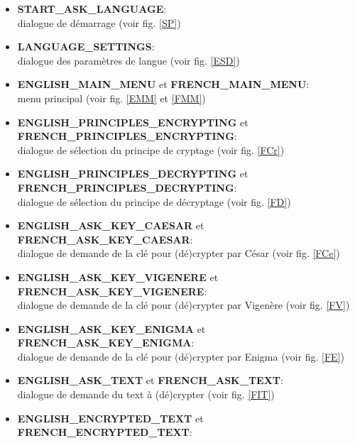\documentclass[a4paper,12pt,abstracton,titlepage]{scrartcl}
\begin{document}
{\begin{itemize}
\item \textbf{START\_ASK\_LANGUAGE}:\\
dialogue de démarrage (voir fig. \ref{SP})\\
\item \textbf{LANGUAGE\_SETTINGS}:\\
dialogue des paramètres de langue (voir fig. \ref{ESD})\\
\item \textbf{ENGLISH\_MAIN\_MENU} et \textbf{FRENCH\_MAIN\_MENU}:\\
menu principal (voir fig. \ref{EMM} et \ref{FMM})\\
\item \textbf{ENGLISH\_PRINCIPLES\_ENCRYPTING} et\\
\textbf{FRENCH\_PRINCIPLES\_ENCRYPTING}:\\
dialogue de sélection du principe de cryptage (voir fig. \ref{FCr})\\
\item \textbf{ENGLISH\_PRINCIPLES\_DECRYPTING} et\\
\textbf{FRENCH\_PRINCIPLES\_DECRYPTING}:\\
dialogue de sélection du principe de décryptage (voir fig. \ref{FD})\\
\item \textbf{ENGLISH\_ASK\_KEY\_CAESAR} et \textbf{FRENCH\_ASK\_KEY\_CAESAR}:\\
dialogue de demande de la clé pour (dé)crypter par César (voir fig. \ref{FCe})\\
\item \textbf{ENGLISH\_ASK\_KEY\_VIGENERE} et \textbf{FRENCH\_ASK\_KEY\_VIGENERE}:\\
dialogue de demande de la clé pour (dé)crypter par Vigenère (voir fig. \ref{FV})\\
\item \textbf{ENGLISH\_ASK\_KEY\_ENIGMA} et \textbf{FRENCH\_ASK\_KEY\_ENIGMA}:\\
dialogue de demande de la clé pour (dé)crypter par Enigma (voir fig. \ref{FE})\\
\item \textbf{ENGLISH\_ASK\_TEXT} et \textbf{FRENCH\_ASK\_TEXT}:\\
dialogue de demande du text à (dé)crypter (voir fig. \ref{FIT})\\
\item \textbf{ENGLISH\_ENCRYPTED\_TEXT} et \textbf{FRENCH\_ENCRYPTED\_TEXT}:\\

\end{itemize}}
\end{document}
